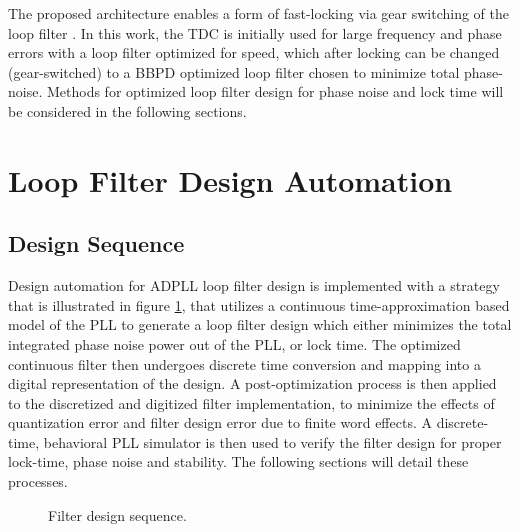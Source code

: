 The proposed architecture enables a form of fast-locking via gear switching of the loop filter \cite{staszewski_balsara_2007}. In this work, the TDC is initially used for large frequency and phase errors with a loop filter optimized for speed, which after locking can be changed (gear-switched) to a BBPD optimized loop filter chosen to minimize total phase-noise. Methods for optimized loop filter design for phase noise and lock time will be considered in the following sections.

\section{Loop Filter Design Automation}\label{methods_lf_design_approach}

\subsection{Design Sequence}
	Design automation for ADPLL loop filter design is implemented with a strategy that is illustrated in figure \ref{fig:filt_design_seq}, that utilizes a continuous time-approximation based model of the PLL to generate a loop filter design which either minimizes the total integrated phase noise power out of the PLL, or lock time. The optimized continuous filter then undergoes discrete time conversion and mapping into a digital representation of the design. A post-optimization process is then applied to the discretized and digitized filter implementation, to minimize the effects of quantization error and filter design error due to finite word effects. A discrete-time, behavioral PLL simulator is then used to verify the filter design for proper lock-time, phase noise and stability. The following sections will detail these processes.

	\begin{figure}[htb!]
		\center
		\caption{Filter design sequence.}
		\label{fig:filt_design_seq}
	\end{figure}

